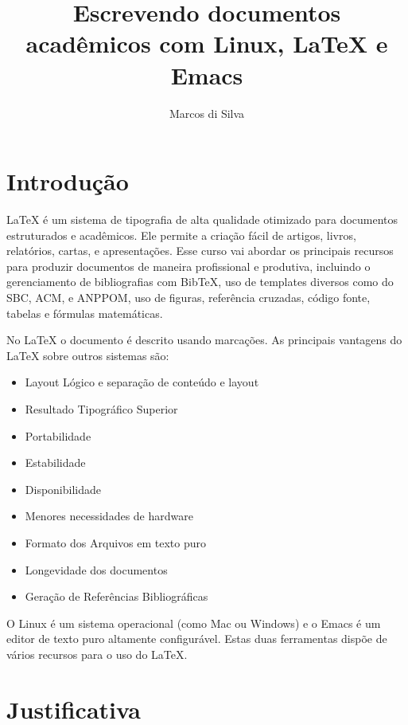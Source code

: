 \documentclass[12pt,brazil]{article}
\begin{document}

\title{Escrevendo documentos acadêmicos com Linux, \LaTeX{} e Emacs}
\author{Marcos di Silva}
\maketitle

\thispagestyle{empty}

\section{Introdução}

\LaTeX{} é um sistema de tipografia de alta qualidade otimizado para
documentos estruturados e acadêmicos. Ele permite a criação fácil de
artigos, livros, relatórios, cartas, e apresentações. Esse curso vai
abordar os principais recursos para produzir documentos de maneira
profissional e produtiva, incluindo o gerenciamento de bibliografias
com BibTeX, uso de templates diversos como do SBC, ACM, e ANPPOM, uso
de figuras, referência cruzadas, código fonte, tabelas e fórmulas
matemáticas.

No \LaTeX{} o documento é descrito usando marcações. As principais
vantagens do \LaTeX{} sobre outros sistemas são:

\begin{itemize}
\item Layout Lógico e separação de conteúdo e layout
\item Resultado Tipográfico Superior
\item Portabilidade
\item Estabilidade
\item Disponibilidade
\item Menores necessidades de hardware
\item Formato dos Arquivos em texto puro
\item Longevidade dos documentos
\item Geração de Referências Bibliográficas
\end{itemize}

O Linux é um sistema operacional (como Mac ou Windows) e o Emacs é um
editor de texto puro altamente configurável. Estas duas ferramentas
dispõe de vários recursos para o uso do \LaTeX.

\section{Justificativa}
\end{document}
